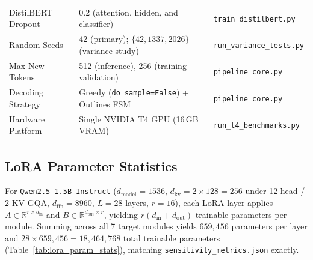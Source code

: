\documentclass[11pt,a4paper]{article}
\begin{document}
\begin{table}[htbp]
\begin{tabular}{@{}p{3.4cm} p{6.2cm} p{3.2cm}@{}}
DistilBERT Dropout & 0.2 (attention, hidden, and classifier) & \texttt{train\_distilbert.py} \\
Random Seeds & 42 (primary); $\{42, 1337, 2026\}$ (variance study) & \texttt{run\_variance\_tests.py} \\
Max New Tokens & 512 (inference), 256 (training validation) & \texttt{pipeline\_core.py} \\
Decoding Strategy & Greedy (\texttt{do\_sample=False}) + Outlines FSM & \texttt{pipeline\_core.py} \\
Hardware Platform & Single NVIDIA T4 GPU (16\,GB VRAM) & \texttt{run\_t4\_benchmarks.py} \\
\bottomrule
\end{tabular}
\end{table}

\subsection{LoRA Parameter Statistics}
For \texttt{Qwen2.5-1.5B-Instruct} ($d_{\text{model}}=1536$, $d_{\text{kv}}=2 \times 128 = 256$ under 12-head / 2-KV GQA, $d_{\text{ffn}}=8960$, $L=28$ layers, $r=16$), each LoRA layer applies $A \in \mathbb{R}^{r \times d_{\text{in}}}$ and $B \in \mathbb{R}^{d_{\text{out}} \times r}$, yielding $r(d_{\text{in}} + d_{\text{out}})$ trainable parameters per module. Summing across all 7 target modules yields $659,456$ parameters per layer and $28 \times 659,456 = 18,464,768$ total trainable parameters (Table~\ref{tab:lora_param_stats}), matching \texttt{sensitivity\_metrics.json} exactly.
\end{document}
